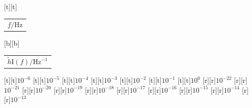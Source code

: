%    
%
%
\begin{psfrags}%
\psfragscanon%
%
[t][t]{\color[rgb]{0,0,0}\setlength{\tabcolsep}{0pt}\begin{tabular}{c}$f/\mathrm{Hz}$\end{tabular}}%
[b][b]{\color[rgb]{0,0,0}\setlength{\tabcolsep}{0pt}\begin{tabular}{c}$\widetilde{h}\mathrm{I}(f)/\mathrm{Hz}^{-1}$\end{tabular}}%
%
[t][t]{$10^{-6}$}%
[t][t]{$10^{-5}$}%
[t][t]{$10^{-4}$}%
[t][t]{$10^{-3}$}%
[t][t]{$10^{-2}$}%
[t][t]{$10^{-1}$}%
[t][t]{$10^{0}$}%
%
[r][r]{$10^{-22}$}%
[r][r]{$10^{-21}$}%
[r][r]{$10^{-20}$}%
[r][r]{$10^{-19}$}%
[r][r]{$10^{-18}$}%
[r][r]{$10^{-17}$}%
[r][r]{$10^{-16}$}%
[r][r]{$10^{-15}$}%
[r][r]{$10^{-14}$}%
[r][r]{$10^{-13}$}%
%
%
\end{psfrags}%
%
